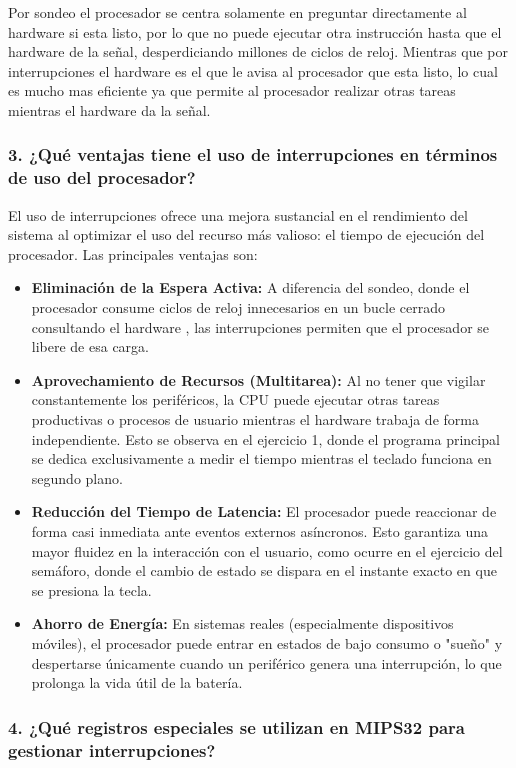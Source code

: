 \documentclass[12pt,a4paper]{article}
\begin{document}
Por sondeo el procesador se centra solamente en preguntar directamente al hardware si esta listo, por lo que no puede ejecutar otra instrucción hasta que el hardware de la señal, desperdiciando millones de ciclos de reloj. Mientras que por interrupciones el hardware es el que le avisa al procesador que esta listo, lo cual es mucho mas eficiente ya que permite al procesador realizar otras tareas mientras el hardware da la señal.

\subsubsection{3. ¿Qué ventajas tiene el uso de interrupciones en términos de uso del procesador?}

El uso de interrupciones ofrece una mejora sustancial en el rendimiento del sistema al optimizar el uso del recurso más valioso: el tiempo de ejecución del procesador. Las principales ventajas son:

\begin{itemize}
    \item \textbf{Eliminación de la Espera Activa:} A diferencia del sondeo, donde el procesador consume ciclos de reloj innecesarios en un bucle cerrado consultando el hardware , las interrupciones permiten que el procesador se libere de esa carga.
    \item \textbf{Aprovechamiento de Recursos (Multitarea):} Al no tener que vigilar constantemente los periféricos, la CPU puede ejecutar otras tareas productivas o procesos de usuario mientras el hardware trabaja de forma independiente. Esto se observa en el ejercicio 1, donde el programa principal se dedica exclusivamente a medir el tiempo mientras el teclado funciona en segundo plano.
    \item \textbf{Reducción del Tiempo de Latencia:} El procesador puede reaccionar de forma casi inmediata ante eventos externos asíncronos. Esto garantiza una mayor fluidez en la interacción con el usuario, como ocurre en el ejercicio del semáforo, donde el cambio de estado se dispara en el instante exacto en que se presiona la tecla.
    \item \textbf{Ahorro de Energía:} En sistemas reales (especialmente dispositivos móviles), el procesador puede entrar en estados de bajo consumo o "sueño" y despertarse únicamente cuando un periférico genera una interrupción, lo que prolonga la vida útil de la batería.
\end{itemize}

\subsubsection{4. ¿Qué registros especiales se utilizan en MIPS32 para gestionar interrupciones?}
\end{document}
